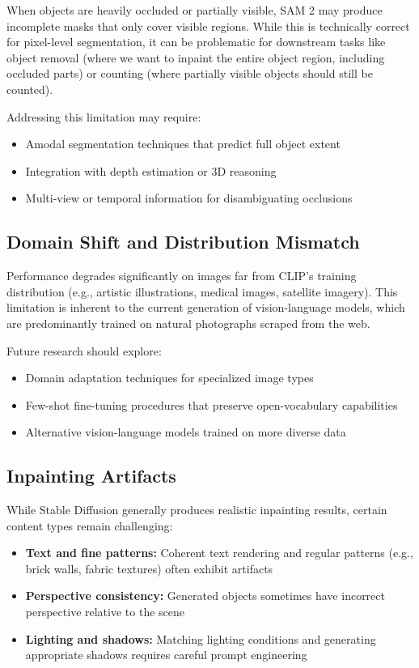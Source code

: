 When objects are heavily occluded or partially visible, SAM 2 may produce incomplete masks that only cover visible regions. While this is technically correct for pixel-level segmentation, it can be problematic for downstream tasks like object removal (where we want to inpaint the entire object region, including occluded parts) or counting (where partially visible objects should still be counted).

Addressing this limitation may require:
\begin{itemize}
    \item Amodal segmentation techniques that predict full object extent
    \item Integration with depth estimation or 3D reasoning
    \item Multi-view or temporal information for disambiguating occlusions
\end{itemize}

\subsection{Domain Shift and Distribution Mismatch}

Performance degrades significantly on images far from CLIP's training distribution (e.g., artistic illustrations, medical images, satellite imagery). This limitation is inherent to the current generation of vision-language models, which are predominantly trained on natural photographs scraped from the web.

Future research should explore:
\begin{itemize}
    \item Domain adaptation techniques for specialized image types
    \item Few-shot fine-tuning procedures that preserve open-vocabulary capabilities
    \item Alternative vision-language models trained on more diverse data
\end{itemize}

\subsection{Inpainting Artifacts}

While Stable Diffusion generally produces realistic inpainting results, certain content types remain challenging:
\begin{itemize}
    \item \textbf{Text and fine patterns:} Coherent text rendering and regular patterns (e.g., brick walls, fabric textures) often exhibit artifacts
    \item \textbf{Perspective consistency:} Generated objects sometimes have incorrect perspective relative to the scene
    \item \textbf{Lighting and shadows:} Matching lighting conditions and generating appropriate shadows requires careful prompt engineering
\end{itemize}

